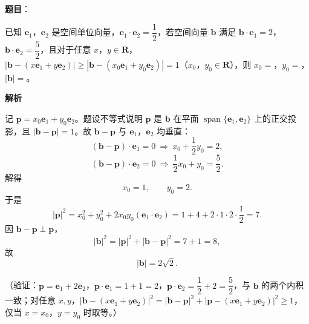 \begin{answer}

\textbf{题目}：

已知 \(\boldsymbol{e}_1\)，\(\boldsymbol{e}_2\) 是空间单位向量，\(\boldsymbol{e}_1\cdot\boldsymbol{e}_2=\dfrac12\)，若空间向量 \(\boldsymbol{b}\) 满足 \(\boldsymbol{b}\cdot\boldsymbol{e}_1=2\)，\(\boldsymbol{b}\cdot\boldsymbol{e}_2=\dfrac52\)，且对于任意 \(x\)，\(y\in\mathbf{R}\)，\(\left|\boldsymbol{b}-(x\boldsymbol{e}_1+y\boldsymbol{e}_2)\right|\geqslant\left|\boldsymbol{b}-(x_0\boldsymbol{e}_1+y_0\boldsymbol{e}_2)\right|=1\)（\(x_0\)，\(y_0\in\mathbf{R}\)），则 \(x_0=\)\gkblank{}，\(y_0=\)\gkblank{}，\(|\boldsymbol{b}|=\)\gkblank{}。

\textbf{解析}

记 \(\boldsymbol{p}=x_0\boldsymbol{e}_1+y_0\boldsymbol{e}_2\)。题设不等式说明 \(\boldsymbol{p}\) 是 \(\boldsymbol{b}\) 在平面 \(\operatorname{span}\{\boldsymbol{e}_1,\boldsymbol{e}_2\}\) 上的正交投影，且 \(\left|\boldsymbol{b}-\boldsymbol{p}\right|=1\)。故 \(\boldsymbol{b}-\boldsymbol{p}\) 与 \(\boldsymbol{e}_1\)，\(\boldsymbol{e}_2\) 均垂直：
\nopagebreak[4]
\[
(\boldsymbol{b}-\boldsymbol{p})\cdot\boldsymbol{e}_1=0
\ \Longrightarrow\ x_0+\frac12y_0=2,
\]
\nopagebreak[4]
\[
(\boldsymbol{b}-\boldsymbol{p})\cdot\boldsymbol{e}_2=0
\ \Longrightarrow\ \frac12x_0+y_0=\frac52.
\]
解得
\nopagebreak[4]
\[
x_0=1,\qquad y_0=2.
\]
于是
\nopagebreak[4]
\[
|\boldsymbol{p}|^2=x_0^2+y_0^2+2x_0y_0(\boldsymbol{e}_1\cdot\boldsymbol{e}_2)
=1+4+2\cdot1\cdot2\cdot\frac12=7.
\]
因 \(\boldsymbol{b}-\boldsymbol{p}\perp\boldsymbol{p}\)，
\nopagebreak[4]
\[
|\boldsymbol{b}|^2=|\boldsymbol{p}|^2+|\boldsymbol{b}-\boldsymbol{p}|^2=7+1=8,
\]
故
\nopagebreak[4]
\[
|\boldsymbol{b}|=2\sqrt2.
\]

（验证：\(\boldsymbol{p}=\boldsymbol{e}_1+2\boldsymbol{e}_2\)，\(\boldsymbol{p}\cdot\boldsymbol{e}_1=1+1=2\)，\(\boldsymbol{p}\cdot\boldsymbol{e}_2=\dfrac12+2=\dfrac52\)，与 \(\boldsymbol{b}\) 的两个内积一致；对任意 \(x,y\)，\(|\boldsymbol{b}-(x\boldsymbol{e}_1+y\boldsymbol{e}_2)|^2=|\boldsymbol{b}-\boldsymbol{p}|^2+|\boldsymbol{p}-(x\boldsymbol{e}_1+y\boldsymbol{e}_2)|^2\geqslant1\)，仅当 \(x=x_0\)，\(y=y_0\) 时取等。）


\end{answer}
